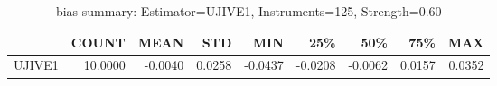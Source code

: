 \begin{table}[ht]
\centering
\caption{bias summary: Estimator=UJIVE1, Instruments=125, Strength=0.60}
\begin{tabular}{lrrrrrrrr}
\toprule
 & COUNT & MEAN & STD & MIN & 25\% & 50\% & 75\% & MAX \\
\midrule
UJIVE1 & 10.0000 & -0.0040 & 0.0258 & -0.0437 & -0.0208 & -0.0062 & 0.0157 & 0.0352 \\
\bottomrule
\end{tabular}
\end{table}
